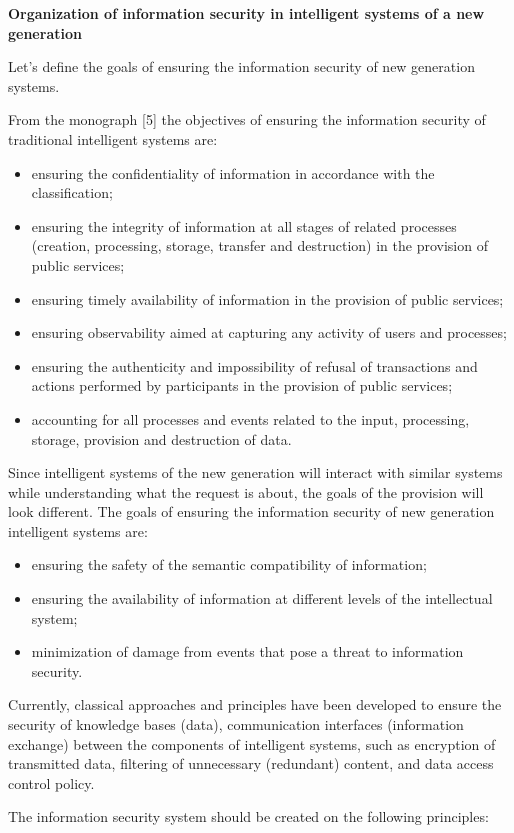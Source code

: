 \documentclass{article}
\begin{document}
\begin{multicols}{2}
\par 
\textbf{Organization of information security in intelligent
systems of a new generation}
\par
Let’s define the goals of ensuring the information security of new generation systems.
\par
From the monograph [5] the objectives of ensuring the information security of traditional intelligent systems are:
\begin{itemize}

    \item ensuring the confidentiality of information in accordance with the classification;
    \item ensuring the integrity of information at all stages of related processes (creation, processing, storage, transfer and destruction) in the provision of public services;
    \item ensuring timely availability of information in the
provision of public services;
    \item ensuring observability aimed at capturing any activity
of users and processes;
    \item ensuring the authenticity and impossibility of refusal of transactions and actions performed by participants in the provision of public services;
     \item accounting for all processes and events related to the input, processing, storage, provision and destruction of data.
\end{itemize}

\par Since intelligent systems of the new generation will interact with similar systems while understanding what the request is about, the goals of the provision will look different. The goals of ensuring the information security of new generation intelligent systems are:
\begin{itemize}
    \item ensuring the safety of the semantic compatibility of information;
    \item ensuring the availability of information at different
levels of the intellectual system;
    \item minimization of damage from events that pose a
threat to information security.
\end{itemize}

\par Currently, classical approaches and principles have
been developed to ensure the security of knowledge bases
(data), communication interfaces (information exchange)
between the components of intelligent systems, such as
encryption of transmitted data, filtering of unnecessary
(redundant) content, and data access control policy.
\par The information security system should be created on
the following principles:


\end{multicols}
\end{document}

